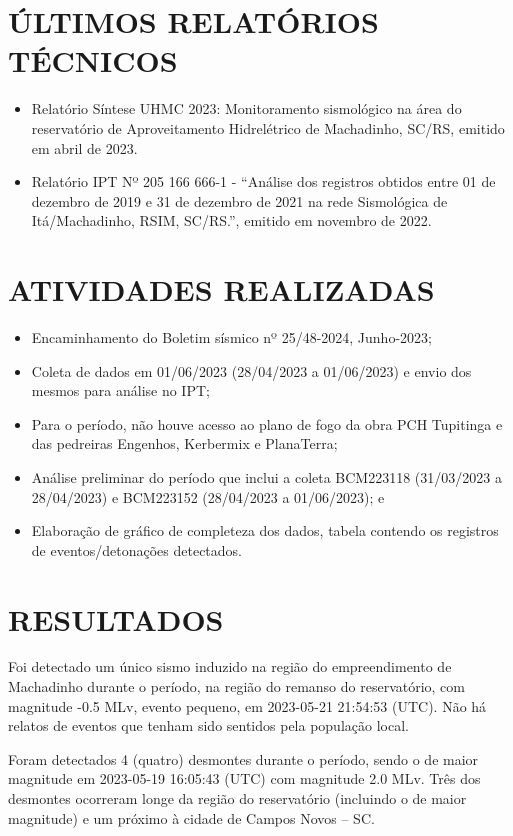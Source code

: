 \section{ÚLTIMOS RELATÓRIOS TÉCNICOS}
\label{sec:ultimos_relatorios}
\begin{itemize}
    \item Relatório Síntese UHMC 2023: Monitoramento sismológico na área do reservatório de Aproveitamento Hidrelétrico de Machadinho, SC/RS, emitido em abril de 2023.
    \item Relatório IPT Nº 205 166 666-1 - “Análise dos registros obtidos entre 01 de dezembro de 2019 e 31 de dezembro de 2021 na rede Sismológica de Itá/Machadinho, RSIM, SC/RS.”, emitido em novembro de 2022.
\end{itemize}

\section{ATIVIDADES REALIZADAS}
\label{sec:atividade}
\begin{itemize}
    \item Encaminhamento do Boletim sísmico nº 25/48-2024, Junho-2023;
    \item Coleta de dados em 01/06/2023 (28/04/2023 a 01/06/2023) e envio dos mesmos para análise no IPT;
    \item Para o período, não houve acesso ao plano de fogo da obra PCH Tupitinga e das pedreiras Engenhos, Kerbermix e PlanaTerra;
    \item Análise preliminar do período que inclui a coleta BCM223118 (31/03/2023 a 28/04/2023) e BCM223152 (28/04/2023 a 01/06/2023); e
    \item Elaboração de gráfico de completeza dos dados, tabela contendo os registros de eventos/detonações detectados.
\end{itemize}

\section{RESULTADOS}
\label{sec:resultados}
Foi detectado um único sismo induzido na região do empreendimento de Machadinho durante o período, na região do remanso do reservatório, com magnitude -0.5 MLv, evento pequeno, em 2023-05-21 21:54:53 (UTC). Não há relatos de eventos que tenham sido sentidos pela população local.

Foram detectados 4 (quatro) desmontes durante o período, sendo o de maior magnitude em 2023-05-19 16:05:43 (UTC) com magnitude 2.0 MLv. Três dos desmontes ocorreram longe da região do reservatório (incluindo o de maior magnitude) e um próximo à cidade de Campos Novos – SC.

